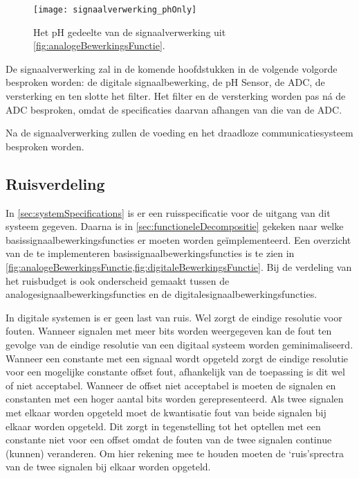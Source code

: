\begin{figure}[!htbp]
    \centering
    \texttt{[image: signaalverwerking\_phOnly]}
    \caption{Het pH gedeelte van de signaalverwerking uit \cref{fig:analogeBewerkingsFunctie}.}
    \label{fig:signaalverwerking_phOnly}
\end{figure}

De signaalverwerking zal in de komende hoofdstukken in de volgende volgorde besproken worden: de digitale signaalbewerking, de pH Sensor, de ADC, de versterking en ten slotte het filter. Het filter en de versterking worden pas n\'a %
de ADC besproken, omdat de specificaties daarvan afhangen van die van de ADC.

Na de signaalverwerking zullen de voeding en het draadloze communicatiesysteem besproken worden.

\subsection{Ruisverdeling}
In \cref{sec:systemSpecifications} is er een ruisspecificatie voor de uitgang van dit systeem gegeven. Daarna is in \cref{sec:functioneleDecompositie} gekeken naar welke basissignaalbewerkingsfuncties er moeten worden geïmplementeerd. Een overzicht van de te implementeren basissignaalbewerkingsfuncties is te zien in \cref{fig:analogeBewerkingsFunctie,fig:digitaleBewerkingsFunctie}. Bij de verdeling van het ruisbudget is ook onderscheid gemaakt tussen de analogesignaalbewerkingsfuncties en de digitalesignaalbewerkingsfuncties.

In digitale systemen is er geen last van ruis. Wel zorgt de eindige resolutie voor fouten. Wanneer signalen met meer bits worden weergegeven kan de fout ten gevolge van de eindige resolutie van een digitaal systeem worden geminimaliseerd. Wanneer een constante met een signaal wordt opgeteld zorgt de eindige resolutie voor een mogelijke constante offset fout, afhankelijk van de toepassing is dit wel of niet acceptabel. Wanneer de offset niet acceptabel is moeten de signalen en constanten met een hoger aantal bits worden gerepresenteerd. Als twee signalen met elkaar worden opgeteld moet de kwantisatie fout van beide signalen bij elkaar worden opgeteld. Dit zorgt in tegenstelling tot het optellen met een constante niet voor een offset omdat de fouten van de twee signalen continue (kunnen) veranderen. Om hier rekening mee te houden moeten de `ruis'sprectra van de twee signalen bij elkaar worden opgeteld.

